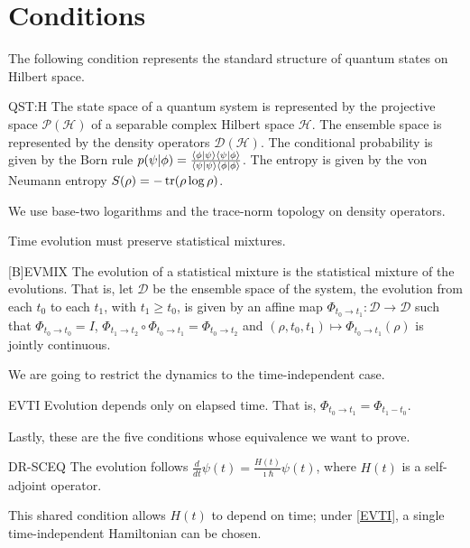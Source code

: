 \documentclass{techbrief}
\begin{document}
\section{Conditions}

The following condition represents the standard structure of quantum states on Hilbert space.
\begin{condition}{QST:H}
	The state space of a quantum system is represented by the projective space $\mathcal{P}(\mathcal{H})$ of a separable complex Hilbert space $\mathcal{H}$. The ensemble space is represented by the density operators $\mathcal{D}(\mathcal{H})$. The conditional probability is given by the Born rule $p(\psi|\phi) = \frac{\langle \phi | \psi \rangle\langle \psi | \phi \rangle}{\langle \psi | \psi \rangle\langle \phi | \phi \rangle}$. The entropy is given by the von Neumann entropy $S(\rho) = -\operatorname{tr}(\rho \log \rho)$.
\end{condition}

We use base-two logarithms and the trace-norm topology on density operators.

Time evolution must preserve statistical mixtures.
\begin{condition}{[B]EVMIX}
	The evolution of a statistical mixture is the statistical mixture of the evolutions. That is, let $\mathcal{D}$ be the ensemble space of the system, the evolution from each $t_0$ to each $t_1$, with $t_1\geq t_0$, is given by an affine map $\Phi_{t_0 \to t_1}:\mathcal{D}\to \mathcal{D}$ such that $\Phi_{t_0 \to t_0}=I$, $\Phi_{t_1 \to t_2}\circ \Phi_{t_0 \to t_1}=\Phi_{t_0 \to t_2}$ and $(\rho,t_0,t_1)\mapsto \Phi_{t_0 \to t_1}(\rho)$ is jointly continuous.
\end{condition}

We are going to restrict the dynamics to the time-independent case.
\begin{condition}{EVTI}
	Evolution depends only on elapsed time. That is, $\Phi_{t_0 \to t_1}=\Phi_{t_1-t_0}$.
\end{condition}

Lastly, these are the five conditions whose equivalence we want to prove.
\begin{condition}{DR-SCEQ}
	The evolution follows $\frac{d}{dt} \psi(t) = \frac{H(t)}{\imath \hbar} \psi(t)$, where $H(t)$ is a self-adjoint operator.
\end{condition}
This shared condition allows $H(t)$ to depend on time; under \ref{EVTI}, a single time-independent Hamiltonian can be chosen.
\end{document}
